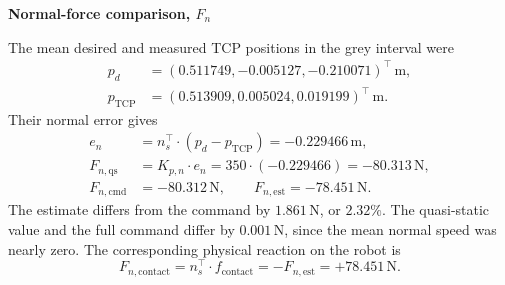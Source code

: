 \documentclass[11pt,a4paper]{article}
\begin{document}
\par\smallskip
\noindent\textbf{Normal-force comparison, \(F_n\)}\par
The mean desired and measured TCP positions in the grey interval were
\[
 \begin{aligned}
 p_d&=(0.511749,-0.005127,-0.210071)^\top\,\mathrm{m},\\
 p_{\mathrm{TCP}}&=(0.513909,0.005024,0.019199)^\top\,\mathrm{m}.
 \end{aligned}
\]
Their normal error gives
\[
 \begin{aligned}
 e_n&=n_s^\top\mathbin{\cdot}(p_d-p_{\mathrm{TCP}})
 =-0.229466\,\mathrm{m},\\
 F_{n,\mathrm{qs}}&=K_{p,n}\mathbin{\cdot}e_n
 =350\mathbin{\cdot}(-0.229466)=-80.313\,\mathrm{N},\\
 F_{n,\mathrm{cmd}}&=-80.312\,\mathrm{N},\qquad
 F_{n,\mathrm{est}}=-78.451\,\mathrm{N}.
 \end{aligned}
\]
The estimate differs from the command by \(1.861\,\mathrm{N}\), or
\(2.32\%\).  The quasi-static value and the full command differ by
\(0.001\,\mathrm{N}\), since the mean normal speed was nearly zero.
The corresponding physical reaction on the robot is
\[
 F_{n,\mathrm{contact}}
 =n_s^\top\mathbin{\cdot}f_{\mathrm{contact}}
 =-F_{n,\mathrm{est}}=+78.451\,\mathrm{N}.
\]
\end{document}
